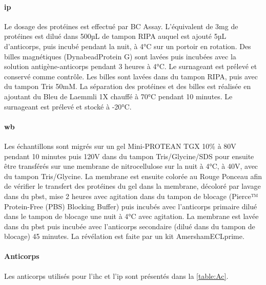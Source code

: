 \paragraph{\Acrlong{ip}}
\label{par:ip}
	Le dosage des protéines est effectué par BC Assay. L'équivalent de 3mg de protéines est dilué dans 500µL de tampon RIPA auquel est ajouté 5µL d'anticorps, puis incubé pendant la nuit, à 4°C sur un portoir en rotation. Des billes magnétiques (Dynabead\textregistered Protein G) sont lavées puis incubées avec la solution antigène-anticorps pendant 3 heures à 4°C. Le surnageant est prélevé et conservé comme contrôle. Les billes sont lavées dans du tampon RIPA, puis avec du tampon Tris 50mM. La séparation des protéines et des billes est réalisée en ajoutant du Bleu de Laemmli 1X chauffé à 70°C pendant 10 minutes. Le surnageant est prélevé et stocké à -20°C. 
	
\paragraph{\Acrlong{wb}}
\label{par:wb}
	Les échantillons sont migrés sur un gel Mini-PROTEAN\textregistered{}  TGX 10\% à 80V pendant 10 minutes puis 120V dans du tampon Tris/Glycine/SDS pour ensuite être transférés sur une membrane de nitrocellulose sur la nuit à 4°C, à 40V, avec du tampon Tris/Glycine. La membrane est ensuite colorée au Rouge Ponceau afin de vérifier le transfert des protéines du gel dans la membrane, décoloré par lavage dans du \acrshort{pbst}, mise 2 heures avec agitation dans du tampon de blocage (Pierce™ Protein-Free (PBS) Blocking Buffer) puis incubés avec l'anticorps primaire dilué dans le tampon de blocage une nuit à 4°C avec agitation. La membrane est lavée dans du \acrshort{pbst} puis incubée avec l'anticorps secondaire (dilué dans du tampon de blocage) 45 minutes. La révélation est faite par un kit Amersham\texttrademark ECL\texttrademark prime.
		
\paragraph{Anticorps}
\label{par:anticorps}
	Les anticorps utilisés pour l'\acrfull{ihc} et l'\acrfull{ip} sont présentés dans la \cref{table:Ac}.
	
